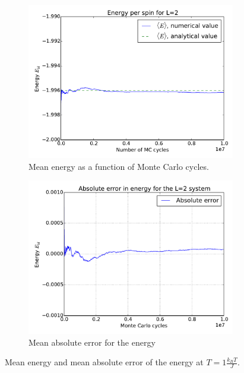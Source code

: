 	\begin{figure}[H]
	\begin{subfigure}[b]{0.49\textwidth}
	\includegraphics[width=1\linewidth]{../results/4b/L_2_energy}
\caption{Mean energy as a function of Monte Carlo cycles. }
\label{fig:l2energy}
	\end{subfigure}
	\hfill
	\begin{subfigure}[b]{0.49\textwidth}
	\includegraphics[width=1\linewidth]{../results/4b/abs_error}
\caption{Mean absolute error for the energy}
\label{fig:abserror}
	\end{subfigure}
	\caption{Mean energy and mean absolute error of the energy at $T=1 \frac{k_BT}{J}$.}
\end{figure}

